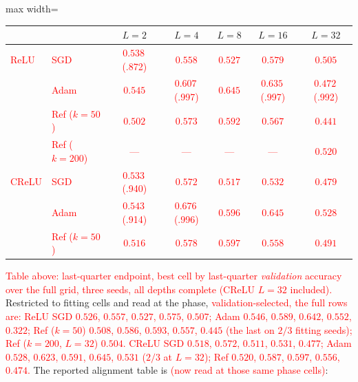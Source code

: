 \documentclass{article}
\newcommand{\nat}[1]{\textcolor{red}{#1}}
\theoremstyle{definition}
\theoremstyle{remark}
\begin{document}
\begin{center}\small
\begin{adjustbox}{max width=\linewidth}
\begin{tabular}{llccccc}
\toprule
 & & $L=2$ & $L=4$ & $L=8$ & $L=16$ & $L=32$ \\
\midrule
\nat{ReLU} & \nat{SGD} & \nat{$0.538$\,{\scriptsize(.872)}} & \nat{$0.558$} & \nat{$0.527$} & \nat{$0.579$} & \nat{$0.505$} \\
      & \nat{Adam} & \nat{$\mathbf{0.545}$} & \nat{$\mathbf{0.607}$\,{\scriptsize(.997)}} & \nat{$\mathbf{0.645}$} & \nat{$\mathbf{0.635}$\,{\scriptsize(.997)}} & \nat{$0.472$\,{\scriptsize(.992)}} \\
      & \nat{Ref ($k{=}50$)} & \nat{$0.502$} & \nat{$0.573$} & \nat{$0.592$} & \nat{$0.567$} & \nat{$0.441$} \\
      & \nat{Ref ($k{=}200$)} & \nat{---} & \nat{---} & \nat{---} & \nat{---} & \nat{$\mathbf{0.520}$} \\
\midrule
\nat{CReLU} & \nat{SGD} & \nat{$0.533$\,{\scriptsize(.940)}} & \nat{$0.572$} & \nat{$0.517$} & \nat{$0.532$} & \nat{$0.479$} \\
      & \nat{Adam} & \nat{$\mathbf{0.543}$\,{\scriptsize(.914)}} & \nat{$\mathbf{0.676}$\,{\scriptsize(.996)}} & \nat{$0.596$} & \nat{$\mathbf{0.645}$} & \nat{$\mathbf{0.528}$} \\
      & \nat{Ref ($k{=}50$)} & \nat{$0.516$} & \nat{$0.578$} & \nat{$\mathbf{0.597}$} & \nat{$0.558$} & \nat{$0.491$} \\
\bottomrule
\end{tabular}
\end{adjustbox}
\end{center}

\nat{Table above: last-quarter endpoint, best cell by last-quarter \emph{validation} accuracy over the full grid, three seeds, all depths complete (CReLU $L=32$ included).} Restricted to fitting cells and read at the phase, \nat{validation-selected, the full rows are: ReLU SGD $0.526$, $0.557$, $0.527$, $0.575$, $0.507$; Adam $0.546$, $0.589$, $0.642$, $0.552$, $0.322$; Ref ($k{=}50$) $0.508$, $0.586$, $0.593$, $0.557$, $0.445$ (the last on $2/3$ fitting seeds); Ref ($k{=}200$, $L{=}32$) $0.504$. CReLU SGD $0.518$, $0.572$, $0.511$, $0.531$, $0.477$; Adam $0.528$, $0.623$, $0.591$, $0.645$, $0.531$ ($2/3$ at $L{=}32$); Ref $0.520$, $0.587$, $0.597$, $0.556$, $0.474$.} The reported alignment table is \nat{(now read at those same phase cells)}:
\end{document}
